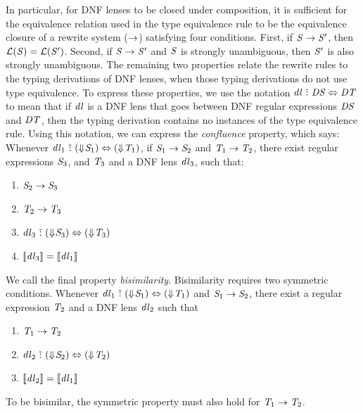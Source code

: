\documentclass[acmsmall]{acmart}
\begin{document}
In particular, for DNF lenses to be closed under composition, it is sufficient
for the equivalence relation used in the type equivalence rule
to be the equivalence closure of a rewrite system ($\rightarrow$) satisfying
four conditions.
First, if $\mathit{S} \rightarrow \mathit{S}'$, then $\mathcal{L}(\mathit{S}) =
\mathcal{L}(\mathit{S}')$.
Second, if $\mathit{S} \rightarrow \mathit{S}'$ and $\mathit{S}$ is strongly unambiguous, then
$\mathit{S}'$ is also strongly unambiguous.
The remaining two properties relate the rewrite rules to the typing derivations
of DNF lenses, when those typing derivations do not use type
equivalence.
To express these properties, 
we use the notation
$\mathit{dl} \,\,\tilde{:}\,\, \mathit{DS} \Leftrightarrow \mathit{DT}$
to mean that
if $\mathit{dl}$ is a DNF lens that
goes between DNF regular expressions $\mathit{DS}$ and $\mathit{DT}$, then the
typing derivation contains no instances of the type equivalence rule.
Using this notation, we can express the \textit{confluence} property, which says:
Whenever $\mathit{dl}_1 \,\,\tilde{:}\,\, (\Downarrow\mkern-4mu \mathit{S}_1) \Leftrightarrow
(\Downarrow\mkern-4mu \mathit{T}_1)$,
if $\mathit{S}_1 \rightarrow
\mathit{S}_2$ and $\mathit{T}_1 \rightarrow \mathit{T}_2$, there exist regular
expressions $\mathit{S}_3$, and
$\mathit{T}_3$ and a DNF lens $\mathit{dl}_3$, such that:
\begin{enumerate}
\item $\mathit{S}_2 \rightarrow \mathit{S}_3$
\item $\mathit{T}_2 \rightarrow \mathit{T}_3$
\item $\mathit{dl}_3 \,\,\tilde{:}\,\, (\Downarrow\mkern-4mu \mathit{S}_3) \Leftrightarrow
  (\Downarrow\mkern-4mu \mathit{T}_3)$
\item $[ \! [\mathit{dl}_3] \! ] = [ \! [\mathit{dl}_1] \! ]$
\end{enumerate}
We call the final property \textit{bisimilarity}.  Bisimilarity requires two
symmetric conditions.
Whenever $\mathit{dl}_1 \,\,\tilde{:}\,\, (\Downarrow\mkern-4mu \mathit{S}_1) \Leftrightarrow
(\Downarrow\mkern-4mu \mathit{T}_1)$ and 
$\mathit{S}_1 \rightarrow \mathit{S}_2$, there exist a regular expression $\mathit{T}_2$ and a
DNF lens $\mathit{dl}_2$ such that
\begin{enumerate}
\item $\mathit{T}_1 \rightarrow \mathit{T}_2$
\item $\mathit{dl}_2 \,\,\tilde{:}\,\, (\Downarrow\mkern-4mu \mathit{S}_2) \Leftrightarrow
  (\Downarrow\mkern-4mu \mathit{T}_2)$
\item $[ \! [\mathit{dl}_2] \! ] = [ \! [\mathit{dl}_1] \! ]$
\end{enumerate}
To be bisimilar, the symmetric property must also hold for $\mathit{T}_1 \rightarrow
\mathit{T}_2$.
\end{document}
